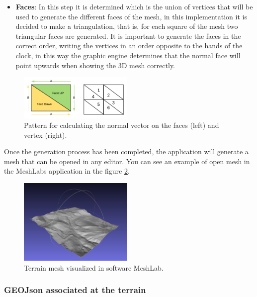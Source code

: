 \documentclass[10pt,a4paper,twocolumn,twoside]{article}
\begin{document}
\begin{itemize}
  \item \textbf{Faces}: In this step it is determined which is the union of vertices that will be used to generate the different faces of the mesh, in this implementation it is decided to make a triangulation, that is, for each square of the mesh two triangular faces are generated. It is important to generate the faces in the correct order, writing the vertices in an order opposite to the hands of the clock, in this way the graphic engine determines that the normal face will point upwards when showing the 3D mesh correctly.
\end{itemize}

\begin{figure}[h]
\centering
  	\includegraphics[width=0.49\textwidth]{patternmeshgeneration}
	\caption{Pattern for calculating the normal vector on the faces (left) and vertex (right).}
	\label{fig-normalpattern}
\end{figure}

Once the generation process has been completed, the application will generate a mesh that can be opened in any editor. You can see an example of open mesh in the MeshLabs application in the figure \ref{fig-meshlab}.

\begin{figure}[h]
\centering
  	\includegraphics[width=0.49\textwidth]{mesh_example_meshlab}
	\caption{Terrain mesh visualized in software MeshLab.}
	\label{fig-meshlab}
\end{figure}

\subsubsection{GEOJson associated at the terrain}
\end{document}
